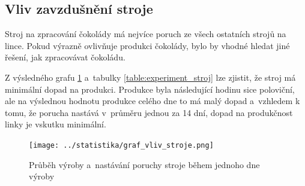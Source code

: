 \documentclass[11pt,a4paper,titlepage]{article}
\begin{document}
			\subsection{Vliv zavzdušnění stroje}
				Stroj na zpracování čokolády má nejvíce poruch ze všech ostatních strojů na lince.
				Pokud výrazně ovlivňuje produkci čokolády, bylo by vhodné hledat jiné řešení,
				jak zpracovávat čokoládu.

				Z výsledného grafu \ref{fig:graf_stroj} a~tabulky \ref{table:experiment_stroj} lze
				zjistit, že stroj má minimální dopad na produkci. Produkce byla následující
				hodinu sice poloviční, ale na výslednou hodnotu produkce celého dne to má malý
				dopad a~vzhledem k tomu, že porucha nastává v~průměru jednou za 14 dní,
				dopad na produkčnost linky je vskutku minimální.
				\begin{figure}[H]
				\begin{center}
					\texttt{[image: ../statistika/graf\_vliv\_stroje.png]}
					\caption{ Průběh výroby a~nastávání poruchy stroje během jednoho dne výroby }
					\label{fig:graf_stroj}
				\end{center}
				\end{figure}
\end{document}
